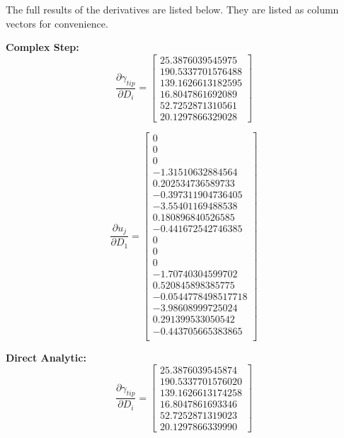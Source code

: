 \documentclass[12pt,parskip=full]{article}
\numberwithin{subsection}{section}
\begin{document}
		The full results of the derivatives are listed below. They are listed as column vectors for convenience.
		
		\textbf{Complex Step:}
		\begin{equation}
			\frac{\partial \gamma_{tip}}{\partial D_i} = \begin{bmatrix}    25.3876039545975 \\
												   190.5337701576488 \\
												   139.1626613182595 \\
												   16.8047861692089 \\
												   52.7252871310561 \\
												   20.1297866329028
   			\end{bmatrix}
		\end{equation}

		\begin{equation}
			\frac{\partial u_j}{\partial D_1} = \begin{bmatrix} 0 \\	0\\ 0\\	-1.31510632884564 \\	0.202534736589733 \\	-0.397311904736405 \\	-3.55401169488538 \\	0.180896840526585 \\	-0.441672542746385 \\	0 \\	0 \\	0 \\	-1.70740304599702 \\	0.520845898385775 \\	-0.0544778498517718 \\	-3.98608999725024 \\	0.291399533050542 \\	-0.443705665383865 \\
   			\end{bmatrix}
		\end{equation}
		
		
		
		\pagebreak
		\textbf{Direct Analytic:}
		\begin{equation}
			\frac{\partial \gamma_{tip}}{\partial D_i} = \begin{bmatrix}    25.3876039545874 \\
   190.5337701576020 \\
   139.1626613174258 \\
   16.8047861693346 \\
   52.7252871319023 \\
   20.1297866339990
   			\end{bmatrix}
		\end{equation}
\end{document}
